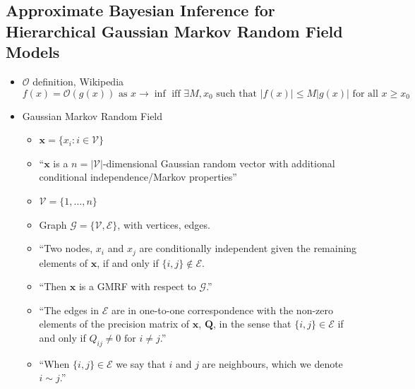 \documentclass{article}
\begin{document}
\subsection*{Approximate Bayesian Inference for Hierarchical Gaussian Markov Random Field Models \citep{Rue2007}}
\begin{itemize}
\item $\mathcal{O}$ definition, Wikipedia
$$f(x) = \mathcal{O}(g(x)) \text{ as } x \rightarrow \inf \text{ iff } \exists M, x_{0} \text{ such that } |f(x)| \leq M|g(x)| \text{ for all } x \geq x_{0}$$
\item Gaussian Markov Random Field 
  \begin{itemize}
  \item $\pmb{x} = \{ x_{i}:i \in \mathscr{V} \}$
  \item ``$\pmb{x}$ is a $n = |\mathscr{V}|$-dimensional Gaussian random vector with additional conditional independence/Markov properties'' 
  \item $\mathscr{V} = \{1,\dots,n\}$
  \item Graph $\mathscr{G} = \{ \mathscr{V}, \mathscr{E} \}$, with vertices, edges.
  \item ``Two nodes, $x_{i}$ and $x_{j}$ are conditionally independent given the remaining elements of $\pmb{x}$, if and only if $\{i, j\} \notin \mathscr{E}$.
  \item ``Then $\pmb{x}$ is a GMRF with respect to $\mathscr{G}$.''
  \item ``The edges in $\mathscr{E}$ are in one-to-one correspondence with the non-zero elements of the precision matrix of $\pmb{x}$, $\pmb{Q}$, in the sense that $\{ i, j \} \in \mathscr{E}$ if and only if $Q_{ij} \neq 0 \text{ for } i \neq j$.''
  \item ``When $\{i,j\} \in \mathscr{E}$ we say that $i$ and $j$ are neighbours, which we denote $i \sim j$.''
  \end{itemize}
  

\end{itemize}
\end{document}
